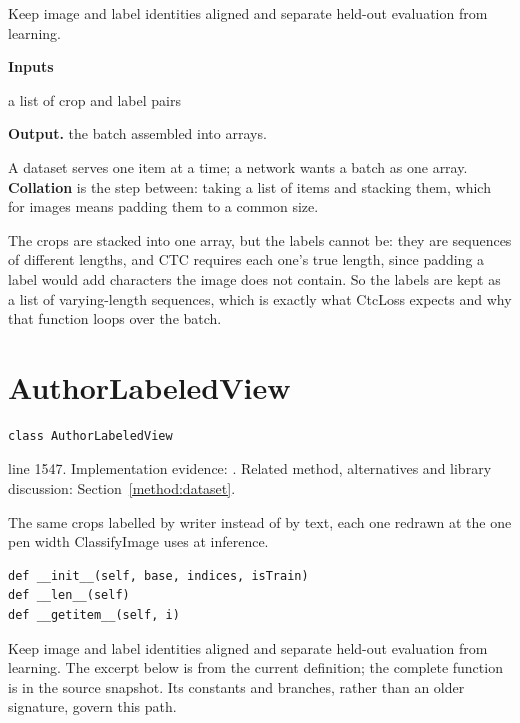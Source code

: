 Keep image and label identities aligned and separate held-out evaluation from learning.




\noindent\textbf{Inputs}
\begin{description}[leftmargin=2.2em,style=nextline,font=\normalfont\ttfamily]\setlength\itemsep{1pt}
  \item[{batch}] \normalfont a list of crop and label pairs
\end{description}

\noindent\textbf{Output.} the batch assembled into arrays.


A dataset serves one item at a time; a network wants a batch as one array. \textbf{Collation} is the step between: taking a list of items and stacking them, which for images means padding them to a common size.


The crops are stacked into one array, but the labels cannot be: they are sequences of different lengths, and CTC requires each one's true length, since padding a label would add characters the image does not contain. So the labels are kept as a list of varying-length sequences, which is exactly what CtcLoss expects and why that function loops over the batch.



\section{AuthorLabeledView}\label{fn:train:AuthorLabeledView}
\begin{lstlisting}[style=sig]
class AuthorLabeledView
\end{lstlisting}
 line 1547. Implementation evidence: \cite{code2026}. Related method, alternatives and library discussion: Section~\ref{method:dataset}.


The same crops labelled by writer instead of by text, each one redrawn at the one pen width ClassifyImage uses at inference.


\begin{lstlisting}[style=plain]
def __init__(self, base, indices, isTrain)
def __len__(self)
def __getitem__(self, i)
\end{lstlisting}
Keep image and label identities aligned and separate held-out evaluation from learning. The excerpt below is from the current definition; the complete function is in the source snapshot. Its constants and branches, rather than an older signature, govern this path.


